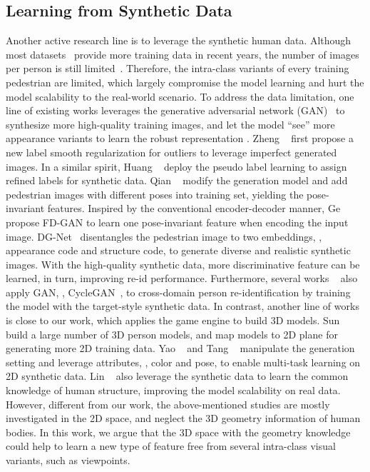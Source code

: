 \subsection{Learning from Synthetic Data}
Another active research line is to leverage the synthetic human data. Although most datasets~\cite{zheng2015scalable,ristani2016performance} provide more training data in recent years, the number of images per person is still limited~\cite{zheng2017unlabeled}. Therefore, the intra-class variants of every training pedestrian are limited, which largely compromise the model learning and hurt the model scalability to the real-world scenario. To address the data limitation, one line of existing works leverages the generative adversarial network (GAN)~\cite{goodfellow2014generative} to synthesize more high-quality training images, and let the model ``see'' more appearance variants to learn the robust representation \cite{zheng2019joint,ge2018fd,eom2019learning,qian2018pose,zheng2017unlabeled,liu2018pose,zhong2018camera,zou2020joint}. Zheng \etal~\cite{zheng2017unlabeled} first propose a new label smooth regularization for outliers to leverage imperfect generated images. In a similar spirit, Huang \etal~\cite{huang2018multi} deploy the pseudo label learning to assign refined labels for synthetic data. Qian \etal~\cite{qian2018pose} modify the generation model and add pedestrian images with different poses into training set, yielding the pose-invariant features. 
Inspired by the conventional encoder-decoder manner, Ge \etal~\cite{ge2018fd} propose FD-GAN to learn one pose-invariant feature when encoding the input image. DG-Net~\cite{zheng2019joint} disentangles the pedestrian image to two embeddings, \ie, appearance code and structure code, to generate diverse and realistic synthetic images. With the high-quality synthetic data, more discriminative feature can be learned, in turn, improving re-id performance. 
Furthermore, several works ~\cite{deng2018image,zhong2018camera,zhong2020learning,wang2019learning,wei2018person} also apply GAN, \ie, CycleGAN~\cite{CycleGAN2017}, to cross-domain person re-identification by training the model with the target-style synthetic data.
In contrast, another line of works \cite{sun2019dissecting,tang2019pamtri,yao2019simulating} is close to our work, which applies the game engine to build 3D models. Sun \etal~\cite{sun2019dissecting} build a large number of 3D person models, and map models to 2D plane for generating more 2D training data. Yao \etal~\cite{yang2018foldingnet} and Tang \etal~\cite{tang2019pamtri} manipulate the generation setting and leverage attributes, \eg, color and pose, to enable multi-task learning on 2D synthetic data. 
Lin \etal~\cite{lin2020cross} also leverage the synthetic data to learn the common knowledge of human structure, improving the model scalability on real data. However, different from our work, the above-mentioned studies are mostly investigated in the 2D space, and neglect the 3D geometry information of human bodies. In this work, we argue that the 3D space with the geometry knowledge could help to learn a new type of feature free from several intra-class visual variants, such as viewpoints.

